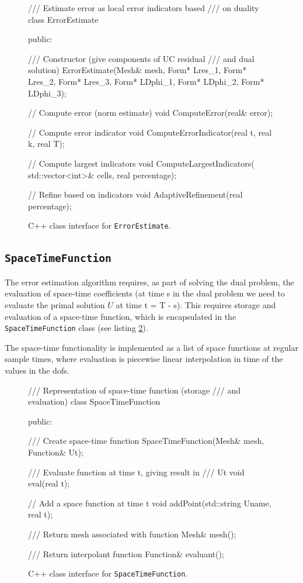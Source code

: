 \begin{figure}[!h]
{\small
\begin{c++}
/// Estimate error as local error indicators based
/// on duality
class ErrorEstimate
{
public:

  /// Constructor (give components of UC residual
  /// and dual solution)
  ErrorEstimate(Mesh& mesh,
		Form* Lres_1,
		Form* Lres_2,
		Form* Lres_3,
		Form* LDphi_1,
		Form* LDphi_2,
		Form* LDphi_3);

  // Compute error (norm estimate)
  void ComputeError(real& error);

  // Compute error indicator
  void ComputeErrorIndicator(real t, real k,
                             real T);

  // Compute largest indicators
  void ComputeLargestIndicators(
    std::vector<int>& cells,
    real percentage);

  // Refine based on indicators
  void AdaptiveRefinement(real percentage);
}
\end{c++}
}
\caption{
C++ class interface for {\tt ErrorEstimate}.
}
\label{code:ErrorEstimate}
\end{figure}

\subsection{\tt SpaceTimeFunction}

The error estimation algorithm requires, as part of solving the dual
problem, the evaluation of space-time coefficients (at time s in the
dual problem we need to evaluate the primal solution $U$ at time t = T
- s). This requires storage and evaluation of a space-time function,
which is encapsulated in the {\tt SpaceTimeFunction} class (see
listing \ref{code:SpaceTimeFunction}).

The space-time functionality is implemented as a list of space
functions at regular sample times, where evaluation is piecewise
linear interpolation in time of the values in the dofs.


\begin{figure}[!h]
{\small
\begin{c++}
/// Representation of space-time function (storage
/// and evaluation)
class SpaceTimeFunction
{
public:

  /// Create space-time function
  SpaceTimeFunction(Mesh& mesh, Function& Ut);

  /// Evaluate function at time t, giving result in
  /// Ut
  void eval(real t);

  // Add a space function at time t
  void addPoint(std::string Uname, real t);

  /// Return mesh associated with function
  Mesh& mesh();

  /// Return interpolant function
  Function& evaluant();
}
\end{c++}
}
\caption{
C++ class interface for {\tt SpaceTimeFunction}.
}
\label{code:SpaceTimeFunction}
\end{figure}



